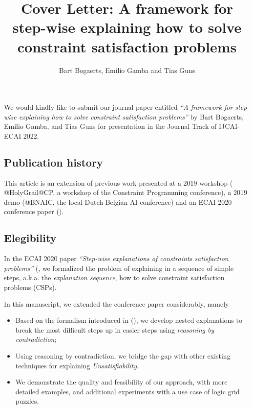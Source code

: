 \documentclass[11pt,a4paper]{article}
\title{Cover Letter: A framework for step-wise explaining how to solve constraint satisfaction problems}
\date{}
\author{Bart Bogaerts, Emilio Gamba and Tias Guns}
\begin{document}
	\maketitle
	We would kindly like to submit our journal paper entitled \emph{``A framework for step-wise explaining how to solve constraint satisfaction problems''} by Bart Bogaerts, Emilio Gamba, and Tias Guns \cite{BOGAERTS2021103550} for presentation in the Journal Track of IJCAI-ECAI 2022.
	
	\subsection*{Publication history}
	This article is an extension of previous work presented at a 2019 workshop  (\cite{claes2019user} @HolyGrail@CP, a workshop of the Constraint Programming conference), a 2019 demo (\cite{claes2019zebratutor}@BNAIC, the local Dutch-Belgian AI conference) and an ECAI 2020 conference paper (\cite{bogaerts2020step}).
	
	\subsection*{Elegibility}
	In the ECAI 2020 paper \emph{``Step-wise explanations of constraints satisfaction problems''} (\cite{bogaerts2020step}, we formalized the problem of explaining in a sequence of simple steps, a.k.a. the \emph{explanation sequence}, how to solve constraint satisfaction problems (CSPs).
	
	In this manuscript, we extended the conference paper considerably, namely
	\begin{itemize}
		\item Based on the formalism introduced in (\cite{bogaerts2020step}), we develop nested explanations to break the most difficult steps up in easier steps using \emph{reasoning by contradiction};
		\item Using reasoning by contradiction, we bridge the gap with other existing techniques for explaining \emph{Unsatisfiability}.
		\item We demonstrate the quality and feasibility of our approach, with more detailed examples, and additional experiments with a use case of logic grid puzzles.
	\end{itemize}
	
\end{document}
